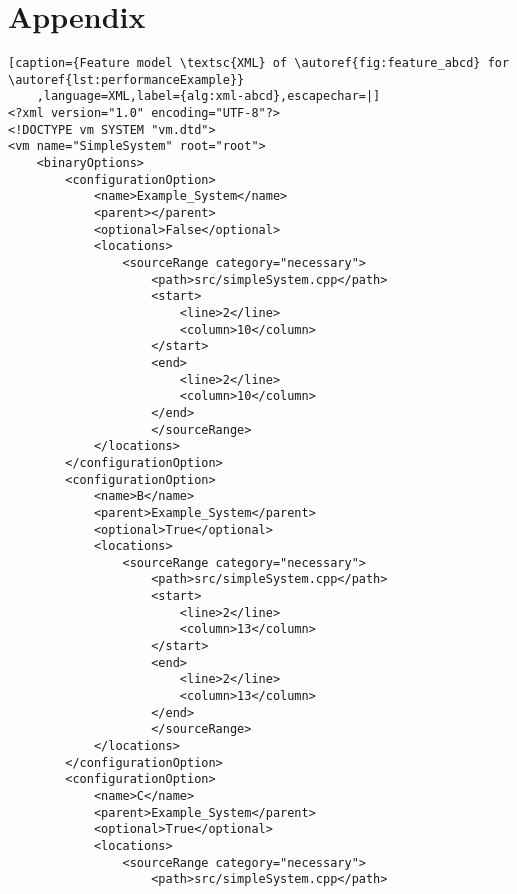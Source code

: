 \chapter{Appendix}\label{ch:appendix}

\begin{lstlisting}[caption={Feature model \textsc{XML} of \autoref{fig:feature_abcd} for \autoref{lst:performanceExample}}
    ,language=XML,label={alg:xml-abcd},escapechar=|]
<?xml version="1.0" encoding="UTF-8"?>
<!DOCTYPE vm SYSTEM "vm.dtd">
<vm name="SimpleSystem" root="root">
    <binaryOptions>                               
        <configurationOption>                     
            <name>Example_System</name>                   
            <parent></parent>
            <optional>False</optional>
            <locations>                              
                <sourceRange category="necessary">    
                    <path>src/simpleSystem.cpp</path>      
                    <start>                               
                        <line>2</line>
                        <column>10</column>
                    </start>
                    <end>                                
                        <line>2</line>
                        <column>10</column>
                    </end>
                    </sourceRange>
            </locations>
        </configurationOption>
        <configurationOption>                     
            <name>B</name>                   
            <parent>Example_System</parent>
            <optional>True</optional>
            <locations>                              
                <sourceRange category="necessary">    
                    <path>src/simpleSystem.cpp</path>      
                    <start>                               
                        <line>2</line>
                        <column>13</column>
                    </start>
                    <end>                                
                        <line>2</line>
                        <column>13</column>
                    </end>
                    </sourceRange>
            </locations>
        </configurationOption>
        <configurationOption>                     
            <name>C</name>                   
            <parent>Example_System</parent>
            <optional>True</optional>
            <locations>                              
                <sourceRange category="necessary">    
                    <path>src/simpleSystem.cpp</path>      

\end{lstlisting}
